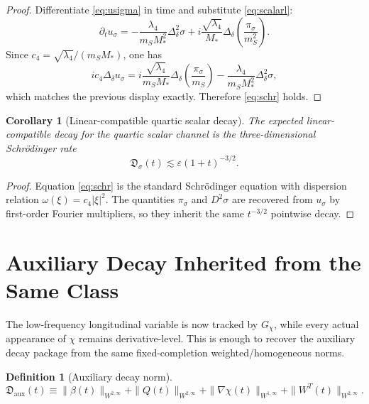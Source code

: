 \documentclass[11pt]{article}
\newtheorem{definition}{Definition}
\newtheorem{corollary}{Corollary}
\begin{document}
\begin{proof}
Differentiate \eqref{eq:usigma} in time and substitute \eqref{eq:scalarl}:
\[
\partial_tu_\sigma
=
-\frac{\lambda_4}{m_SM_*^2}\Delta_\delta^2\sigma
+ i\frac{\sqrt{\lambda_4}}{M_*}\Delta_\delta\left(\frac{\pi_\sigma}{m_S^2}\right).
\]
Since \(c_4=\sqrt{\lambda_4}/(m_SM_*)\), one has
\[
i c_4\Delta_\delta u_\sigma
=
i\frac{\sqrt{\lambda_4}}{m_SM_*}\Delta_\delta\left(\frac{\pi_\sigma}{m_S}\right)
- \frac{\lambda_4}{m_SM_*^2}\Delta_\delta^2\sigma,
\]
which matches the previous display exactly. Therefore \eqref{eq:schr} holds.
\end{proof}

\begin{corollary}[Linear-compatible quartic scalar decay]
\label{cor:scalardecay}
The expected linear-compatible decay for the quartic scalar channel is the three-dimensional Schr\"odinger rate
\begin{equation}
\mathfrak D_\sigma(t)\lesssim \varepsilon(1+t)^{-3/2}.
\label{eq:sigmarate}
\end{equation}
\end{corollary}

\begin{proof}
Equation \eqref{eq:schr} is the standard Schr\"odinger equation with dispersion relation \(\omega(\xi)=c_4|\xi|^2\). The quantities \(\pi_\sigma\) and \(D^2\sigma\) are recovered from \(u_\sigma\) by first-order Fourier multipliers, so they inherit the same \(t^{-3/2}\) pointwise decay.
\end{proof}

\section{Auxiliary Decay Inherited from the Same Class}

The low-frequency longitudinal variable is now tracked by \(G_\chi\), while every actual appearance of \(\chi\) remains derivative-level. This is enough to recover the auxiliary decay package from the same fixed-completion weighted/homogeneous norms.

\begin{definition}[Auxiliary decay norm]
\begin{equation}
\mathfrak D_{\mathrm{aux}}(t)
\equiv
\|\beta(t)\|_{W^{2,\infty}}
+ \|Q(t)\|_{W^{2,\infty}}
+ \|\nabla\chi(t)\|_{W^{1,\infty}}
+ \|W^T(t)\|_{W^{2,\infty}}.
\label{eq:Daux}
\end{equation}
\end{definition}
\end{document}
